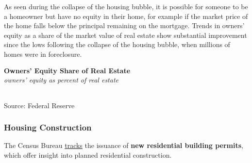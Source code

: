 \documentclass{report}
\makeatletter
\newcommand{\tbllink}[1]{\href{https://raw.githubusercontent.com/bdecon/US-chartbook/master/chartbook/data/#1}{\faTable}}
\newcommand*\short[1]{\expandafter\@gobbletwo\number\numexpr#1\relax}
\newcommand{\shdateaxisticks}{
		date coordinates in=x, axis line style={draw=none},
		xmax={2022-03-15},
		max space between ticks=40,	    
		xtick={{1990-01-01}, {1995-01-01}, {2000-01-01}, 
			{2005-01-01}, {2010-01-01}, {2015-01-01}, {2020-01-01}},
		minor xtick={},
		enlarge y limits={0.06}, enlarge x limits={0.01},
		}
\newcommand{\stdline}[4]{\addplot[very thick, no markers, color=#1] 
		table [x=#2, y=#3, col sep=comma] {#4};	}
\newcommand{\rbars}{
		\fill[color=black!10] (axis cs:{1990-07-01},\pgfkeysvalueof{/pgfplots/ymin}) rectangle 
			(axis cs:{1991-03-01}, \pgfkeysvalueof{/pgfplots/ymax});
		\fill[color=black!10] (axis cs:{2007-12-01},\pgfkeysvalueof{/pgfplots/ymin}) rectangle 
			(axis cs:{2009-07-01}, \pgfkeysvalueof{/pgfplots/ymax});
		\fill[color=black!10] (axis cs:{2001-03-01},\pgfkeysvalueof{/pgfplots/ymin}) rectangle 
			(axis cs:{2001-11-01}, \pgfkeysvalueof{/pgfplots/ymax});
		\fill[color=black!10] (axis cs:{2020-02-01},\pgfkeysvalueof{/pgfplots/ymin}) rectangle 
			(axis cs:{2020-05-01}, \pgfkeysvalueof{/pgfplots/ymax});}
\makeatother
\begin{document}
{\begin{minipage}{0.76\textwidth}
As seen during the collapse of the housing bubble, it is possible for someone to be a homeowner but have no equity in their home, for example if the market price of the home falls below the principal remaining on the mortgage. Trends in owners' equity as a share of the market value of real estate show substantial improvement since the lows following the collapse of the housing bubble, when millions of homes were in foreclosure. 
\end{minipage}
\vspace{1mm}

\begin{minipage}{0.29\textwidth}
\small 
\end{minipage}\hspace{7mm}
\begin{minipage}{0.46\textwidth}
\normalsize \textbf{Owners' Equity Share of Real Estate}\\
\footnotesize{\textit{owners' equity as percent of real estate}}\\
\hspace*{-2mm} \\
\footnotesize{Source: Federal Reserve} \hspace{30mm} \tbllink{homeeq.csv} 

\end{minipage}
\newpage
\begin{minipage}{0.76\textwidth}
\subsubsection*{Housing Construction}
\small The Census Bureau \href{https://www.census.gov/construction/bps/}{tracks} the issuance of \textbf{new residential building permits}, which offer insight into planned residential construction. 
\vspace{1mm}


\end{minipage}}
\end{document}
